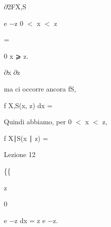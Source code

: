 \documentclass[a4paper,portrait,12pt]{article}
\begin{document}
\begin{flushleft}
$\partial$2FX,S
\end{flushleft}


\begin{flushleft}
e $-$z 0 $<$ x $<$ z
\end{flushleft}


=


\begin{flushleft}
0 x ⩾ z.
\end{flushleft}


\begin{flushleft}
$\partial$x $\partial$z
\end{flushleft}





\begin{flushleft}
ma ci occorre ancora fS,
\end{flushleft}





\begin{flushleft}
f X,S(x, z) dx =
\end{flushleft}





\begin{flushleft}
Quindi abbiamo, per 0 $<$ x $<$ z,
\end{flushleft}


\begin{flushleft}
f X∣S(x ∣ z) =
\end{flushleft}





\begin{flushleft}
Lezione 12
\end{flushleft}





\{\{





\begin{flushleft}
z
\end{flushleft}


0





\begin{flushleft}
e $-$z dx = z e $-$z.
\end{flushleft}
\end{document}
